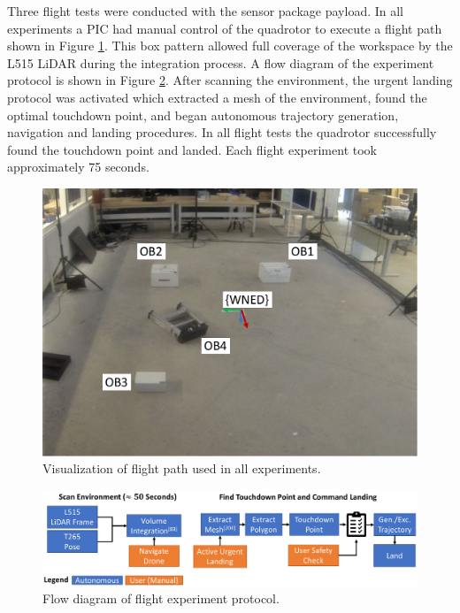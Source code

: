 Three flight tests were conducted with the sensor package payload. In all experiments a \ac{PIC} had manual control of the quadrotor to execute a flight path shown in Figure \ref{fig:ch7_flight_path}. This box pattern allowed full coverage of the workspace by the L515 LiDAR during the integration process.  A flow diagram of the experiment protocol is shown in Figure \ref{fig:ch7_flight_protocol}.  After scanning the environment, the urgent landing protocol was activated which extracted a mesh of the environment, found the optimal touchdown point, and began autonomous trajectory generation, navigation and landing procedures. In all flight tests the quadrotor successfully found the touchdown point and landed. Each flight experiment took approximately 75 seconds.


\begin{figure}[!htb]
    \centering  
    \includegraphics[page=3,width=.40\linewidth]{chapter_7_experiments/imgs/ExperimentSetup.pdf}
    \caption[Visualization of flight path used in all experiments]{Visualization of flight path used in all experiments.\label{fig:ch7_flight_path}}
\end{figure}

\begin{figure}[!htb]
    \centering  
   \includegraphics[width=.80\linewidth]{chapter_7_experiments/imgs/LandingProtocol.pdf}
    \caption[Flow diagram of flight experiment protocol]{Flow diagram of flight experiment protocol.\label{fig:ch7_flight_protocol}}
\end{figure}
 



